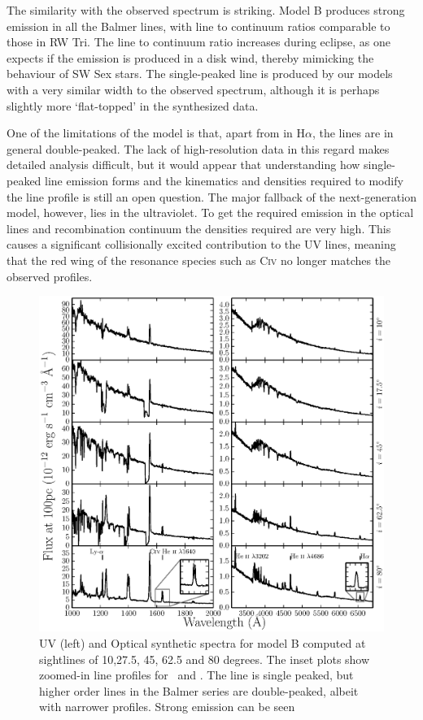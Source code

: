 \documentclass[preprint, a4paper, 11pt]{aastex}
\begin{document}
The similarity with the observed spectrum is striking. 
Model B produces strong emission in all the Balmer lines, 
with line to continuum ratios
comparable to those in RW Tri. 
The line to continuum ratio increases during eclipse,
as one expects if the emission is produced in a disk wind, 
thereby mimicking the behaviour of SW Sex stars.
The single-peaked \ha line is produced by our models with a 
very similar width to the observed spectrum, although it is perhaps slightly more
`flat-topped' in the synthesized data.

One of the limitations of the model is that, apart 
from in H$\alpha$, the lines are in general double-peaked. 
The lack of high-resolution data in this regard makes detailed analysis difficult,
but it would appear that understanding how single-peaked 
line emission forms and the kinematics and densities required to
modify the line profile is still an open question. 
The major fallback of the next-generation model, however, lies
in the ultraviolet. To get the required emission in the optical lines
and recombination continuum the densities required are very high.
This causes a significant collisionally excited contribution
to the UV lines, meaning that the red wing of the 
resonance species such as C\textsc{iv} no longer matches the
observed profiles. 




\begin{figure} %
\includegraphics[width=\textwidth]{figures/fig14_uv_opt.eps}
\caption{
UV (left) and Optical synthetic spectra for model B computed at
sightlines of 10,27.5, 45, 62.5 and 80 degrees.	
The inset plots show zoomed-in line profiles for 
\heiiuv \ and \ha. The \ha line 
is single peaked, but higher order lines in the Balmer series
are double-peaked, albeit with narrower profiles.
Strong \heiiopt emission can be seen
}
\label{uvoptb}
\end{figure} %
\end{document}
